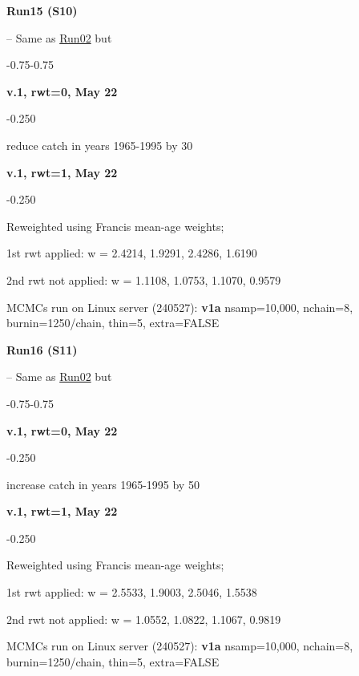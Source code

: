 \hypertarget{R15}{\textbf{Run15 (S10)}} -- Same as \hyperlink{R02}{Run02} but
\begin{itemize_csas}{-0.75}{-0.75}
	\item \textbf{v.1, rwt=0, May 22}
	\begin{itemize_csas}{-0.25}{0}
		\item reduce catch in years 1965-1995 by 30\pc{}
	\end{itemize_csas}
	\item \textbf{v.1, rwt=1, May 22}
	\begin{itemize_csas}{-0.25}{0}
		\item Reweighted using Francis mean-age weights;
		\item 1st rwt applied: w = 2.4214, 1.9291, 2.4286, 1.6190
		\item 2nd rwt not applied: w = 1.1108, 1.0753, 1.1070, 0.9579
		\item MCMCs run on Linux server (240527): \textbf{v1a} nsamp=10,000, nchain=8, burnin=1250/chain, thin=5, extra=FALSE
	\end{itemize_csas}
\end{itemize_csas}

\hypertarget{R16}{\textbf{Run16 (S11)}} -- Same as \hyperlink{R02}{Run02} but
\begin{itemize_csas}{-0.75}{-0.75}
	\item \textbf{v.1, rwt=0, May 22}
	\begin{itemize_csas}{-0.25}{0}
		\item increase catch in years 1965-1995 by 50\pc{}
	\end{itemize_csas}
	\item \textbf{v.1, rwt=1, May 22}
	\begin{itemize_csas}{-0.25}{0}
		\item Reweighted using Francis mean-age weights;
		\item 1st rwt applied: w = 2.5533, 1.9003, 2.5046, 1.5538
		\item 2nd rwt not applied: w = 1.0552, 1.0822, 1.1067, 0.9819
		\item MCMCs run on Linux server (240527): \textbf{v1a} nsamp=10,000, nchain=8, burnin=1250/chain, thin=5, extra=FALSE
	\end{itemize_csas}
\end{itemize_csas}

